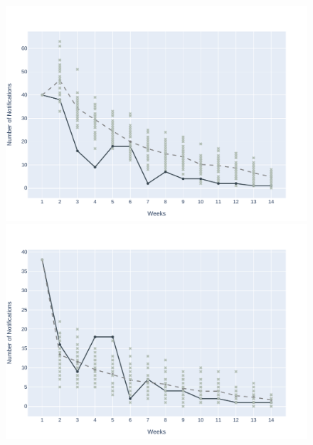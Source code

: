 \begin{figure}[!ht]
\begin{minipage}[c]{.45\textwidth}
		\includegraphics[scale=0.4]{images/experiments-as/AS-2017-01-22.pdf}
	\end{minipage}
	\hspace{0.5cm}
	\begin{minipage}[c]{.45\textwidth}
		\centering
		\includegraphics[scale=0.4]{images/experiments-as/AS-2017-01-29.pdf}
	\end{minipage}
	\\
	\begin{minipage}[c]{.45\textwidth}
		\centering

\end{minipage}
\end{figure}
